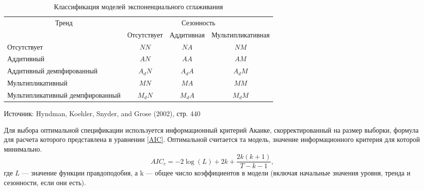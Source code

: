 \begin{center*}
\begin{table}[h]
\renewcommand{\arraystretch}{1.5}
\begin{threeparttable}
\centering
\caption{Классификация моделей экспоненциального сглаживания}
\label{ets_types}
\begin{tabularx}{\textwidth}{Xccc}
\toprule
\multicolumn{1}{c}{\multirow{2}{*}{Тренд}} & \multicolumn{3}{c}{Сезонность}  \\ \cmidrule(l){2-4} 
\multicolumn{1}{c}{}              &\footnotesize{Отсутствует} & \footnotesize{Аддитивная}&\footnotesize{Мультипликативная}\\ \midrule
\small{Отсутствует}        &  $NN$                     &  $NA$                    &  $NM$    \\
\small{Аддитивный}         &  $AN$                     &   $AA$                   &  $AM$    \\
\small{Аддитивный демпфированный}       & $A_dN$                    &   $A_dA$                 &  $A_dM$    \\
\small{Мультипликативный}&   $MN$                    &  $MA$                    &  $MM$    \\
\small{Мультипликативный демпфированный}&   $M_dN$                  &  $M_dA$                  &  $M_dM$    \\ \bottomrule
\end{tabularx}
\begin{tablenotes}
      \footnotesize 
      \item Источник: Hyndman, Koehler, Snyder, and Grose (2002), стр. 440
\end{tablenotes}
\end{threeparttable}

\end{table}
\end{center*}


Для выбора оптимальной спецификации используется информационный критерий Акаике, скорректированный на размер выборки, формула для расчета которого представлена в уравнении \eqref{AIC}. Оптимальной считается та модель, значение информационного критерия для которой минимально.
\begin{equation}\label{AIC}
AIC_c = -2\log(L) + 2k + \frac{2k(k+1)}{T-k-1},
\end{equation}
где $L$ --- значение функции правдоподобия, а k --- общее число коэффициентов в модели (включая начальные значения уровня, тренда и сезонности, если они есть).

